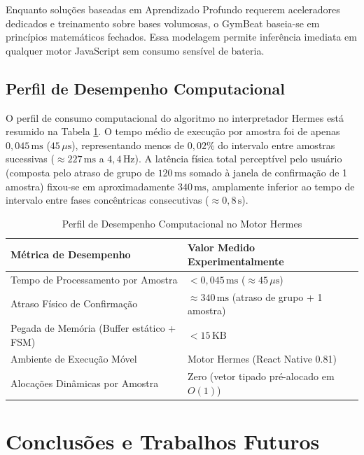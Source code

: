 \documentclass[12pt]{article}
\begin{document}
Enquanto soluções baseadas em Aprendizado Profundo requerem aceleradores dedicados e treinamento sobre bases volumosas, o GymBeat baseia-se em princípios matemáticos fechados. Essa modelagem permite inferência imediata em qualquer motor JavaScript sem consumo sensível de bateria.

\subsection{Perfil de Desempenho Computacional}

O perfil de consumo computacional do algoritmo no interpretador Hermes está resumido na Tabela \ref{tab:perfil_desempenho}. O tempo médio de execução por amostra foi de apenas $0{,}045\,\text{ms}$ ($45\,\mu\text{s}$), representando menos de $0{,}02\%$ do intervalo entre amostras sucessivas ($\approx 227\,\text{ms}$ a $4{,}4\,\text{Hz}$). A latência física total perceptível pelo usuário (composta pelo atraso de grupo de $120\,\text{ms}$ somado à janela de confirmação de 1 amostra) fixou-se em aproximadamente $340\,\text{ms}$, amplamente inferior ao tempo de intervalo entre fases concêntricas consecutivas ($\approx 0{,}8\,\text{s}$).

\begin{table}[ht]
\centering
\caption{Perfil de Desempenho Computacional no Motor Hermes}
\label{tab:perfil_desempenho}
\small
\begin{tabular}{p{8.5cm} p{5.5cm}}
\toprule
\textbf{Métrica de Desempenho} & \textbf{Valor Medido Experimentalmente} \\
\midrule
Tempo de Processamento por Amostra & $< 0{,}045\,\text{ms}$ ($\approx 45\,\mu\text{s}$) \\
Atraso Físico de Confirmação & $\approx 340\,\text{ms}$ (atraso de grupo + 1 amostra) \\
Pegada de Memória (Buffer estático + FSM) & $< 15\,\text{KB}$ \\
Ambiente de Execução Móvel & Motor Hermes (React Native 0.81) \\
Alocações Dinâmicas por Amostra & Zero (vetor tipado pré-alocado em $O(1)$) \\
\bottomrule
\end{tabular}
\end{table}

\section{Conclusões e Trabalhos Futuros}
\end{document}

